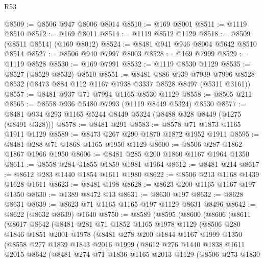 \begin{lexlean}{R53}
\begin{coremodule}
@8509 := @8506 @947 @8006 @8014
@8510 := @169 @8001
@8511 := @1119 @8510
@8512 := @169 @8011
@8514 := @1119 @8512 @1129
@8518 := @8509 (@8511 @8514) (@169 @8012)
@8524 := @8481 @941 @946 @8004 @5642 @8510 @8514
@8527 := @8506 @940 @7997 @8003
@8528 := @169 @7999
@8529 := @1119 @8528
@8530 := @169 @7991
@8532 := @1119 @8530 @1129
@8535 := @8527 (@8529 @8532) @8510
@8551 := @8481
    @886
    @939
    @7939
    @7996
    @8528
    @8532
    (@8473 @884 @112 @1167 @7938 @3337 @8528 @8497 (@5311 @3161))
@8557 := @8481 @937 @71 @7994 @1165 @8530 @1129
@8558 := @8505 @211
@8565 := @8558 @936 @5480 @7993 (@1119 @8449 @5324) @8530
@8577 := @8481 @934 @293 @1165 @5244 @8449 @5324 (@8488 @328 @8449 (@1275 (@8491 @328)))
@8578 := @8481 @291
@8583 := @8578 @71 @1873 @1165 @1911 @1129
@8589 := @8473 @267 @290 @1870 @1872 @1952 @1911
@8595 := @8481 @288 @71 @1868 @1165 @1950 @1129
@8600 := @8506 @287 @1862 @1867 @1966 @1950
@8606 := @8481 @285 @200 @1860 @1167 @1964 @1350
@8611 := @8558 @284 @1855 @1859 @1981 @1964
@8612 := @8481 @214
@8617 := @8612 @283 @1440 @1854 @1611 @1980
@8622 := @8506 @213 @1168 @1439 @1628 @1611
@8623 := @8481 @198
@8628 := @8623 @200 @1165 @1167 @197 @1350
@8630 := @1389 @8472 @13
@8631 := @8630 @197
@8632 := @8628 @8631
@8639 := @8623 @71 @1165 @1165 @197 @1129 @8631 @8496
@8642 := @8622 (@8632 @8639) @1640
@8750 := @8589
    (@8595
      (@8600
        (@8606
          (@8611
            (@8617
              @8642
              (@8481
                @281
                @71
                @1852
                @1165
                @1978
                @1129
                (@8506
                  @280
                  @1846
                  @1851
                  @2001
                  @1978
                  (@8481
                    @278
                    @200
                    @1844
                    @1167
                    @1999
                    @1350
                    (@8558
                      @277
                      @1839
                      @1843
                      @2016
                      @1999
                      (@8612
                        @276
                        @1440
                        @1838
                        @1611
                        @2015
                        @8642
                        (@8481
                          @274
                          @71
                          @1836
                          @1165
                          @2013
                          @1129
                          (@8506
                            @273
                            @1830

\end{coremodule}
\end{lexlean}

